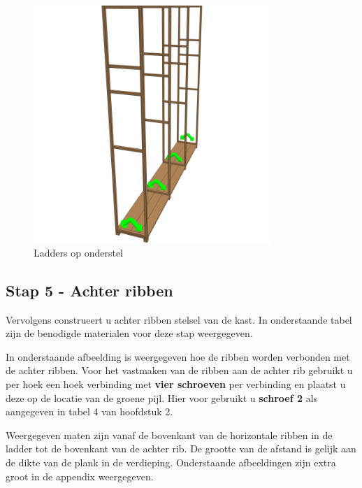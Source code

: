\documentclass{article}
\begin{document}
\begin{figure}[h!]
    \centering
    \includegraphics[width=0.8\textwidth]{scene 4 - geraamte.png}
    \caption{Ladders op onderstel}
    \label{fig:stap 4}
\end{figure}

\clearpage
\newpage

\subsection{Stap 5 - Achter ribben}

Vervolgens construeert u achter ribben stelsel van de kast. In onderstaande tabel zijn de benodigde materialen voor deze stap weergegeven.



In onderstaande afbeelding is weergegeven hoe de ribben worden verbonden met de achter ribben. Voor het vastmaken van de ribben aan de achter rib gebruikt u per hoek een hoek verbinding met \textbf{vier schroeven} per verbinding en plaatst u deze op de locatie van de groene pijl. Hier voor gebruikt u \textbf{schroef 2} als aangegeven in tabel 4 van hoofdstuk 2.

Weergegeven maten zijn vanaf de bovenkant van de horizontale ribben in de ladder tot de bovenkant van de achter rib. De grootte van de afstand is gelijk aan de dikte van de plank in de verdieping. Onderstaande afbeeldingen zijn extra groot in de appendix weergegeven.
\end{document}
